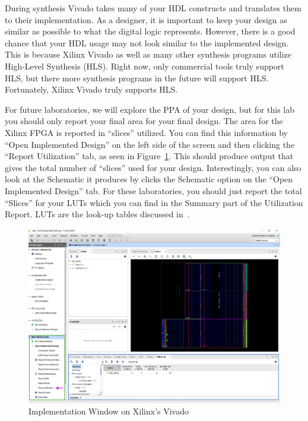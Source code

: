 \documentclass{article}
\begin{document}
During synthesis Vivado takes many of your HDL constructs and
translates them to their implementation.  As a designer, it is
important to keep your design as similar as possible to what the
digital logic represents.  However, there is a good chance that your
HDL usage may not look similar to the implemented design.  This is
because Xilinx Vivado
as well as many other synthesis programs utilize High-Level Synthesis
(HLS).  Right now, only commercial tools truly support HLS, but there
more synthesis programs in the future will support HLS.  Fortunately,
Xilinx Vivado truly supports HLS.

For future laboratories, we will explore the PPA of your design, but
for this lab you should only report your final area for your final design.
The area for the Xilinx FPGA is reported in 
``slices'' utilized.  You can find this information by ``Open
Implemented Design'' on the left side of the screen and then clicking
the ``Report Utilization'' tab, as seen in
Figure~\ref{utilization.fig}.    
This should produce output that
gives the total number of ``slices'' used for your design.
Interestingly, you can also look at the Schematic it produces by
clicks the Schematic option on the ``Open Implemented Design'' tab.
For these laboratories, you should just report the total ``Slices''
for your LUTs which you can find in the Summary part of the
Utilization Report.  LUTs are the look-up tables discussed
in~\cite{7086413}.
\begin{figure}
  \centering
  \includegraphics[scale=0.2]{Utilization.png}
  \caption{Implementation Window on Xilinx's Vivado}
  \label{utilization.fig}
\end{figure}
\end{document}
